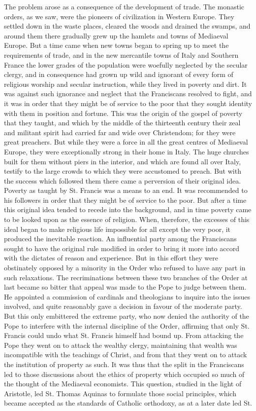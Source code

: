 \documentclass{book}
\begin{document}
The problem arose as a consequence of the development of trade. The monastic orders, as we saw, were the pioneers of civilization in Western Europe. They settled down in the waste places, cleared the woods and drained the swamps, and around them there gradually grew up the hamlets and towns of Mediaeval Europe. But a time came when new towns began to spring up to meet the requirements of trade, and in the new mercantile towns of Italy and Southern France the lower grades of the population were woefully neglected by the secular clergy, and in consequence had grown up wild and ignorant of every form of religious worship and secular instruction, while they lived in poverty and dirt. It was against such ignorance and neglect that the Franciscans resolved to fight, and it was in order that they might be of service to the poor that they sought identity with them in position and fortune. This was the origin of the gospel of poverty that they taught, and which by the middle of the thirteenth century their zeal and militant spirit had carried far and wide over Christendom; for they were great preachers. But while they were a force in all the great centres of Mediaeval Europe, they were exceptionally strong in their home in Italy. The huge churches built for them without piers in the interior, and which are found all over Italy, testify to the large crowds to which they were accustomed to preach. But with the success which followed them there came a perversion of their original idea. Poverty as taught by St. Francis was a means to an end. It was recommended to his followers in order that they might be of service to the poor. But after a time this original idea tended to recede into the background, and in time poverty came to be looked upon as the essence of religion. When, therefore, the excesses of this ideal began to make religious life impossible for all except the very poor, it produced the inevitable reaction. An influential party among the Franciscans sought to have the original rule modified in order to bring it more into accord with the dictates of reason and experience. But in this effort they were obstinately opposed by a minority in the Order who refused to have any part in such relaxations. The recriminations between these two branches of the Order at last became so bitter that appeal was made to the Pope to judge between them. He appointed a commission of cardinals and theologians to inquire into the issues involved, and quite reasonably gave a decision in favour of the moderate party. But this only embittered the extreme party, who now denied the authority of the Pope to interfere with the internal discipline of the Order, affirming that only St. Francis could undo what St. Francis himself had bound up. From attacking the Pope they went on to attack the wealthy clergy, maintaining that wealth was incompatible with the teachings of Christ, and from that they went on to attack the institution of property as such. It was thus that the split in the Franciscans led to those discussions about the ethics of property which occupied so much of the thought of the Mediaeval economists. This question, studied in the light of Aristotle, led St. Thomas Aquinas to formulate those social principles, which became accepted as the standards of Catholic orthodoxy, as at a later date led St. 
\end{document}

